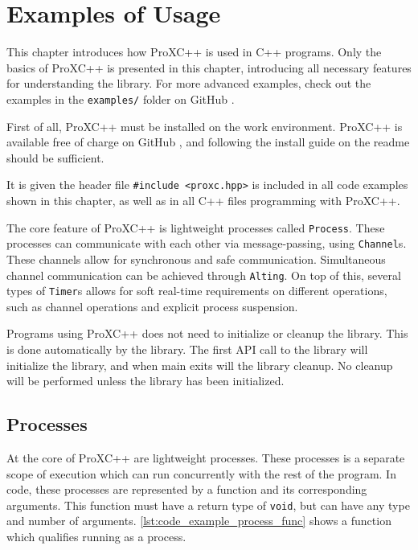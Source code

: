 

\chapter{Examples of Usage}
\label{ch:examples_usage}

This chapter introduces how ProXC++ is used in C++ programs. Only the basics of ProXC++ is presented in this chapter, introducing all necessary features for understanding the library. For more advanced examples, check out the examples in the \texttt{examples/} folder on GitHub \citep{pettersen2017proxcgithub}.

First of all, ProXC++ must be installed on the work environment. ProXC++ is available free of charge on GitHub \citep{pettersen2017proxcgithub}, and following the install guide on the readme should be sufficient.

It is given the header file \lstinline[style={CustomC++}]|#include <proxc.hpp>| is included in all code examples shown in this chapter, as well as in all C++ files programming with ProXC++.

The core feature of ProXC++ is lightweight processes called \texttt{Process}. These processes can communicate with each other via message\hyp{}passing, using \texttt{Channel}s. These channels allow for synchronous and safe communication. Simultaneous channel communication can be achieved through \texttt{Alting}. On top of this, several types of \texttt{Timer}s allows for soft real\hyp{}time requirements on different operations, such as channel operations and explicit process suspension.

Programs using ProXC++ does not need to initialize or cleanup the library. This is done automatically by the library. The first API call to the library will initialize the library, and when main exits will the library cleanup. No cleanup will be performed unless the library has been initialized. 


\section{Processes}


At the core of ProXC++ are lightweight processes. These processes is a separate scope of execution which can run concurrently with the rest of the program. In code, these processes are represented by a function and its corresponding arguments. This function must have a return type of \lstinline[style={CustomC++}]|void|, but can have any type and number of arguments. \cref{lst:code_example_process_func} shows a function which qualifies running as a process.

